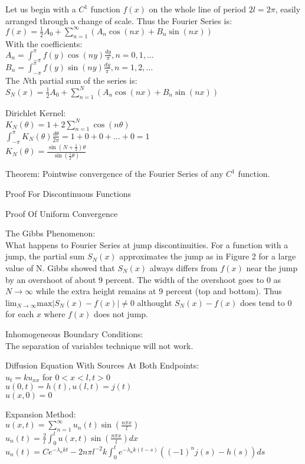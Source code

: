 Let us begin with a $C^1$ function $f(x)$ on the whole line of period $2l=2\pi$, easily arranged through a change of scale. Thus the Fourier Series is: \\
$f(x)=\frac{1}{2} A_0 + \sum_{n=1}^{\infty} (A_n \cos(nx) + B_n \sin (nx))$ \\
With the coefficients: \\
$A_n = \int_{-\pi}^{\pi} f(y)\cos(ny) \frac{dy}{\pi}, n=0,1,\dots$ \\
$B_n = \int_{-\pi}^{\pi} f(y)\sin(ny)\frac{dy}{\pi}, n=1,2,\dots$ \\
The $N$th partial sum of the series is: \\
$S_N (x) = \frac{1}{2} A_0 + \sum_{n=1}^{N} (A_n \cos(nx)+B_n \sin(nx))$

Dirichlet Kernel: \\
$K_N (\theta) = 1+2\sum_{n=1}^N \cos (n \theta)$ \\
$\int_{-\pi}^{\pi} K_N (\theta) \frac{d \theta}{2 \pi} = 1+0+0+\dots+0=1$ \\
$K_N (\theta) = \frac{\sin \left(N+\frac{1}{2} \right) \theta}{\sin \left(\frac{1}{2}\theta \right)}$

Theorem: Pointwise convergence of the Fourier Series of any $C^1$ function.

Proof For Discontinuous Functions

Proof Of Uniform Convergence

The Gibbs Phenomenon: \\
What happens to Fourier Series at jump discontinuities. For a function with a jump, the partial sum $S_N (x)$ approximates the jump as in Figure 2 for a large value of N. Gibbs showed that $S_N (x)$ always differs from $f(x)$ near the jump by an overshoot of about $9$ percent. The width of the overshoot goes to $0$ as $N \to \infty$ while the extra height remains at $9$ percent (top and bottom). Thus $\text{lim}_{N \to \infty} \text{max} |S_N (x)-f(x)| \neq 0$ althought $S_N (x)-f(x)$ does tend to $0$ for each $x$ where $f(x)$ does not jump.

Inhomogeneous Boundary Conditions: \\
The separation of variables technique will not work.

Diffusion Equation With Sources At Both Endpoints: \\
$u_t=ku_{xx}$ for $0<x<l,t>0$ \\
$u(0,t)=h(t), u(l,t)=j(t)$ \\
$u(x,0)=0$

Expansion Method: \\
$u(x,t)=\sum_{n=1}^{\infty} u_n (t) \sin \left(\frac{n \pi x}{l} \right)$ \\
$u_n (t)=\frac{2}{l}\int_0^l u(x,t) \sin \left(\frac{n \pi x}{l} \right) dx$ \\
$u_n (t) = Ce^{-\lambda_n kt}-2 n \pi l^{-2} k \int_0^t e^{-\lambda_n k (t-s)} ((-1)^n j(s)-h(s)) ds$

